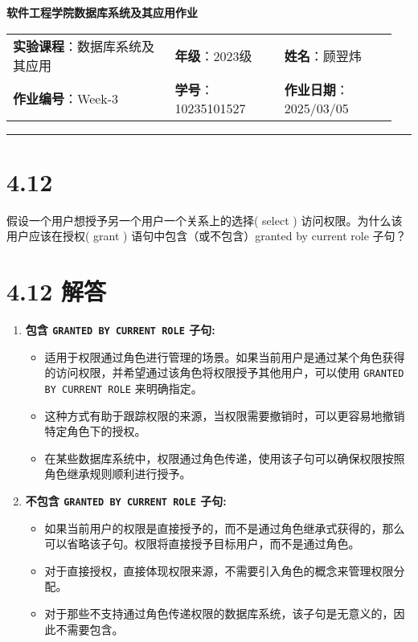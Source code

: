 \documentclass{article}
\begin{document}
	
	\begin{center}
		{\Large{\textbf{\heiti 软件工程学院数据库系统及其应用作业}}}
		\begin{table}[htb]
			\flushleft
			\begin{tabular}{p{0.4\linewidth}p{0.27\linewidth}p{0.28\linewidth}}\\
				\textbf{实验课程}：数据库系统及其应用  & \textbf{年级}：2023级       & \textbf{姓名}：顾翌炜  \\
				\textbf{作业编号}：Week-3    & \textbf{学号}：10235101527 & \textbf{作业日期}：2025/03/05  \\
			\end{tabular}
		\end{table}
	\end{center}
	\rule{\textwidth}{2pt}
	
	\setlength{\parindent}{2em}
	
	\section*{4.12}
	
	假设一个用户想授予另一个用户一个关系上的选择( select ) 访问权限。为什么该用户应该在授权( grant ) 语句中包含（或不包含）granted by current role 子句？
	
	\section*{4.12 解答}
	
	\begin{enumerate}
		\item \textbf{包含 \texttt{GRANTED BY CURRENT ROLE} 子句:}
		\begin{itemize}
			\item 适用于权限通过角色进行管理的场景。如果当前用户是通过某个角色获得的访问权限，并希望通过该角色将权限授予其他用户，可以使用 \texttt{GRANTED BY CURRENT ROLE} 来明确指定。
			\item 这种方式有助于跟踪权限的来源，当权限需要撤销时，可以更容易地撤销特定角色下的授权。
			\item 在某些数据库系统中，权限通过角色传递，使用该子句可以确保权限按照角色继承规则顺利进行授予。
		\end{itemize}
		
		\item \textbf{不包含 \texttt{GRANTED BY CURRENT ROLE} 子句:}
		\begin{itemize}
			\item 如果当前用户的权限是直接授予的，而不是通过角色继承式获得的，那么可以省略该子句。权限将直接授予目标用户，而不是通过角色。
			\item 对于直接授权，直接体现权限来源，不需要引入角色的概念来管理权限分配。
			\item 对于那些不支持通过角色传递权限的数据库系统，该子句是无意义的，因此不需要包含。
		\end{itemize}
	\end{enumerate}
	
\end{document}
